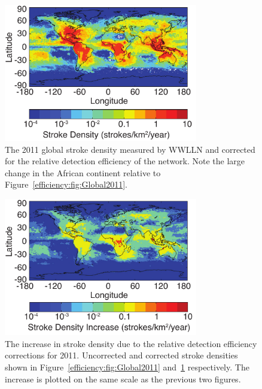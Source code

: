 \begin{figure}[ht!]
   \centering
\noindent\includegraphics[width=20pc]{efficiency/Figures/2012RS005049-p15.pdf}
   \caption{The 2011 global stroke density measured by WWLLN and corrected for the relative detection efficiency of the network.
Note the large change in the African continent relative to Figure~\ref{efficiency:fig:Global2011}.}
   \label{efficiency:fig:Global2011Corrected}
\end{figure}

\begin{figure}[ht!]
   \centering
\noindent\includegraphics[width=20pc]{efficiency/Figures/2012RS005049-p16.pdf}
   \caption{The increase in stroke density due to the relative detection efficiency corrections for 2011.
Uncorrected and corrected stroke densities shown in Figure~\ref{efficiency:fig:Global2011} and~\ref{efficiency:fig:Global2011Corrected} respectively.
The increase is plotted on the same scale as the previous two figures.}
   \label{efficiency:fig:Global2011Diff}
\end{figure}

